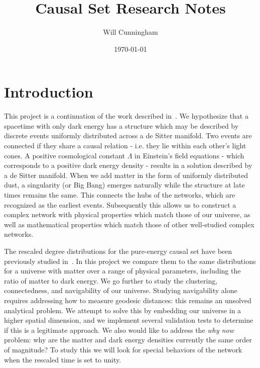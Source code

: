 \documentclass[preprint,notitlepage,amsmath,amssymb,floatfix]{revtex4-1}
\begin{document}
\title{Causal Set Research Notes}

\author{Will Cunningham}

\noaffiliation

\date{\today}


\maketitle

\tableofcontents

\newpage

\section{Introduction}
This project is a continuation of the work described in~\cite{ref:nc2012}.  
We hypothesize that a spacetime with only dark energy has a structure which may be described by discrete events uniformly distributed across a de Sitter manifold.  
Two events are connected if they share a causal relation - i.e. they lie within each other's light cones.  
A positive cosmological constant $\Lambda$ in Einstein's field equations - which corresponds to a positive dark energy density - results in a solution described by a de Sitter manifold.
When we add matter in the form of uniformly distributed dust, a singularity (or Big Bang) emerges naturally while the structure at late times remains the same.  
This connects the hubs of the networks, which are recognized as the earliest events.
Subsequently this allows us to construct a complex network with physical properties which match those of our universe, as well as mathematical properties which match those of other well-studied complex networks. \par
The rescaled degree distributions for the pure-energy causal set have been previously studied in~\cite{ref:nc2012}.
In this project we compare them to the same distributions for a universe with matter over a range of physical parameters, including the ratio of matter to dark energy.
We go further to study the clustering, connectedness, and navigability of our universe.
Studying navigability alone requires addressing how to measure geodesic distances:  this remains an unsolved analytical problem.
We attempt to solve this by embedding our universe in a higher spatial dimension, and we implement several validation tests to determine if this is a legitimate approach.
We also would like to address the \textit{why now} problem:  why are the matter and dark energy densities currently the same order of magnitude?
To study this we will look for special behaviors of the network when the rescaled time is set to unity.
\end{document}
